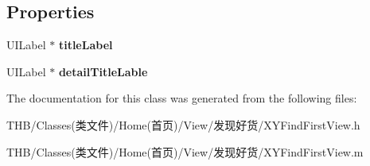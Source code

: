 \subsection*{Properties}
\begin{DoxyCompactItemize}
\item 
\mbox{\label{interface_x_y_find_first_view_a188ce22ada36e7636f54f4294ebb55fd}} 
U\+I\+Label $\ast$ {\bfseries title\+Label}
\item 
\mbox{\label{interface_x_y_find_first_view_a04a007fe403bd60f20beb433bf13c35a}} 
U\+I\+Label $\ast$ {\bfseries detail\+Title\+Lable}
\end{DoxyCompactItemize}


The documentation for this class was generated from the following files\+:\begin{DoxyCompactItemize}
\item 
T\+H\+B/\+Classes(类文件)/\+Home(首页)/\+View/发现好货/X\+Y\+Find\+First\+View.\+h\item 
T\+H\+B/\+Classes(类文件)/\+Home(首页)/\+View/发现好货/X\+Y\+Find\+First\+View.\+m\end{DoxyCompactItemize}
